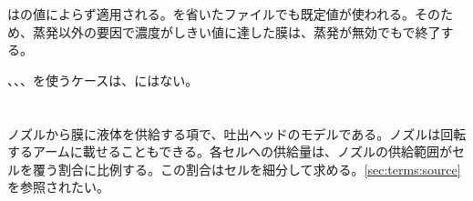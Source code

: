 \begin{warn}[乾燥完了の判定は蒸発を無効にしても行われる]
  はの値によらず適用される。を省いたファイルでも既定値が使われる。そのため、蒸発以外の要因で濃度がしきい値に達した膜は、蒸発が無効でもで終了する。
\end{warn}

、、、を使うケースは、にはない。

\section{}
\label{sec:ref-physics:source}

ノズルから膜に液体を供給する項で、吐出ヘッドのモデルである。ノズルは回転するアームに載せることもできる。各セルへの供給量は、ノズルの供給範囲がセルを覆う割合に比例する。この割合はセルを細分して求める。\cref{sec:terms:source}を参照されたい。

